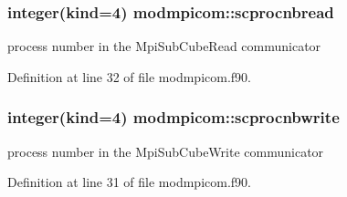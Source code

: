 \subsubsection[{\texorpdfstring{scprocnbread}{scprocnbread}}]{\setlength{\rightskip}{0pt plus 5cm}integer(kind=4) modmpicom\+::scprocnbread}\hypertarget{namespacemodmpicom_a8fde31beaf4b43228d7f93325630cefa}{}\label{namespacemodmpicom_a8fde31beaf4b43228d7f93325630cefa}


process number in the Mpi\+Sub\+Cube\+Read communicator 



Definition at line 32 of file modmpicom.\+f90.

\subsubsection[{\texorpdfstring{scprocnbwrite}{scprocnbwrite}}]{\setlength{\rightskip}{0pt plus 5cm}integer(kind=4) modmpicom\+::scprocnbwrite}\hypertarget{namespacemodmpicom_a8281c8567826b44d76d7a801203c99a8}{}\label{namespacemodmpicom_a8281c8567826b44d76d7a801203c99a8}


process number in the Mpi\+Sub\+Cube\+Write communicator 



Definition at line 31 of file modmpicom.\+f90.

